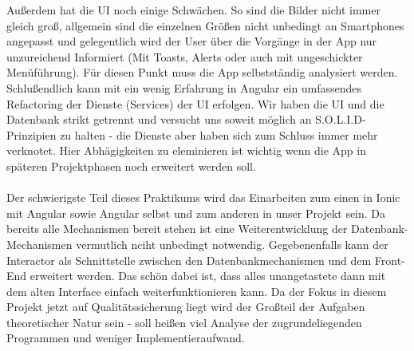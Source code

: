 Außerdem hat die UI noch einige Schwächen. So sind die Bilder nicht immer gleich groß, allgemein sind die einzelnen Größen nicht unbedingt an Smartphones angepasst und gelegentlich wird der User über die Vorgänge in der App nur unzureichend Informiert (Mit Toasts, Alerts oder auch mit ungeschickter Menüführung). Für diesen Punkt muss die App selbstständig analysiert werden.\\
Schlußendlich kann mit ein wenig Erfahrung in Angular ein umfassendes Refactoring der Dienste (Services) der UI erfolgen. Wir haben die UI und die Datenbank strikt getrennt und versucht uns soweit möglich an S.O.L.I.D-Prinzipien zu halten - die Dienste aber haben sich zum Schluss immer mehr verknotet. Hier Abhägigkeiten zu eleminieren ist wichtig wenn die App in späteren Projektphasen noch erweitert werden soll.\\\\
Der schwierigste Teil dieses Praktikums wird das Einarbeiten zum einen in Ionic mit Angular sowie Angular selbst und zum anderen in unser Projekt sein. Da bereits alle Mechanismen bereit stehen ist eine Weiterentwicklung der Datenbank-Mechanismen vermutlich nciht unbedingt notwendig. Gegebenenfalls kann der Interactor als Schnittstelle zwischen den Datenbankmechanismen und dem Front-End erweitert werden. Das schön dabei ist, dass alles unangetastete dann mit dem alten Interface einfach weiterfunktionieren kann. Da der Fokus in diesem Projekt jetzt auf Qualitätssicherung liegt wird der Großteil der Aufgaben \glqq theoretischer\grqq{} Natur sein - soll heißen viel Analyse der zugrundeliegenden Programmen und weniger Implementieraufwand.